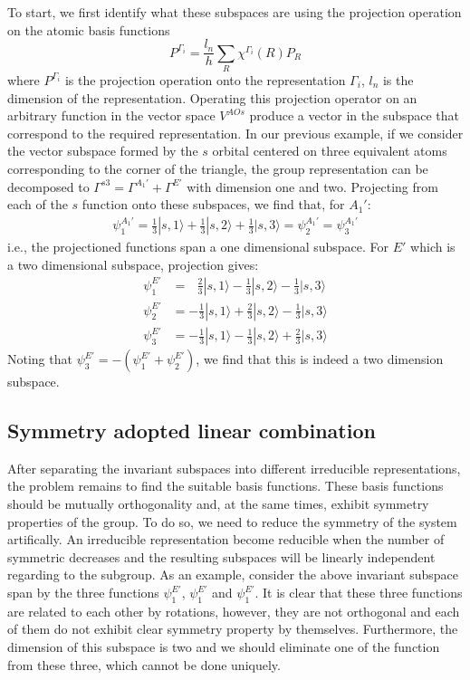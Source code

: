 \documentclass{article}
\begin{document}
To start, we first identify what these subspaces are using the projection operation on the atomic basis functions
\begin{equation}
    P^{\Gamma_i} = \frac{l_n}{h}\sum_R \chi^{\Gamma_i}(R) P_R
\end{equation}
where $P^{\Gamma_i}$ is the projection operation onto the representation $\Gamma_i$, $l_n$ is the dimension of the 
representation. 
Operating this projection operator on an arbitrary function in the vector space $V^{AOs}$ produce a vector in the 
subspace that correspond to the required representation. In our previous example, 
if we consider the vector subspace formed by the $s$ orbital centered on three equivalent atoms corresponding to the 
corner of the triangle, the group representation can be decomposed to $\Gamma^{s3} = \Gamma^{A_1'} + \Gamma^{E'}$
with dimension one and two. 
Projecting from each of the $s$ function onto these subspaces, we find that, for $A_1'$:
\begin{align}
    \psi_1^{A_1'} = \frac{1}{3}|s,1\rangle + \frac{1}{3}|s,2\rangle + \frac{1}{3}|s,3\rangle 
    = \psi_2^{A_1'} = \psi_3^{A_1'}
\end{align}
i.e., the projectioned functions span a one dimensional subspace. 
For $E'$ which is a two dimensional subspace, projection gives:
\begin{align}
    \psi_1^{E'} &= \ \ \ \frac{2}{3}|s,1\rangle - \frac{1}{3}|s,2\rangle - \frac{1}{3}|s,3\rangle  \\
    \psi_2^{E'} &= -\frac{1}{3}|s,1\rangle + \frac{2}{3}|s,2\rangle - \frac{1}{3}|s,3\rangle  \\
    \psi_3^{E'} &= -\frac{1}{3}|s,1\rangle - \frac{1}{3}|s,2\rangle + \frac{2}{3}|s,3\rangle 
\end{align}
Noting that $\psi_3^{E'} = - (\psi_1^{E'} + \psi_2^{E'})$, we find that this is indeed a two dimension 
subspace. 

\subsection{Symmetry adopted linear combination}
After separating the invariant subspaces into different irreducible representations, the problem remains to 
find the suitable basis functions. These basis functions should be mutually orthogonality and, at the same times,
exhibit symmetry properties of the group. 
To do so, we need to reduce the symmetry of the system artifically. An irreducible representation become 
reducible when the number of symmetric decreases and the resulting subspaces will be linearly independent 
regarding to the subgroup. As an example, consider the above invariant subspace span by the three functions
$\psi_1^{E'}$, $\psi_1^{E'}$ and $\psi_1^{E'}$. It is clear that these three functions are related to each 
other by rotations, however, they are not orthogonal and each of them do not exhibit clear symmetry property
by themselves. Furthermore, the dimension of this subspace is two and we should eliminate one of the function
from these three, which cannot be done uniquely. 
\end{document}
